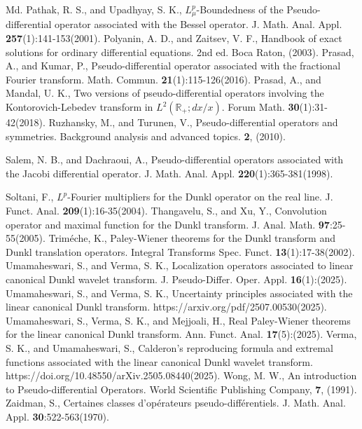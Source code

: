 \documentclass[12pt,a4paper,reqno]{amsproc}
\theoremstyle{definition}
\theoremstyle{remark}
\numberwithin{equation}{section}
\begin{document}
\begin{thebibliography}{Md.}
 Pathak, R. S., and Upadhyay, S. K.,  $L_\mu^p$-Boundedness of the Pseudo-differential operator associated with the Bessel operator. J. Math. Anal. Appl. \textbf{257}(1):141-153(2001).
Polyanin, A. D., and  Zaitsev, V. F., Handbook of exact solutions for ordinary differential equations. 2nd ed. Boca Raton, (2003).
Prasad, A., and  Kumar, P.,
Pseudo-differential operator associated with the fractional Fourier transform. Math. Commun. \textbf{21}(1):115-126(2016).
Prasad, A., and  Mandal, U. K., Two versions of pseudo-differential operators involving the Kontorovich-Lebedev transform in $L^2(\mathbb{R}_+;dx/x)$. Forum Math. \textbf{30}(1):31-42(2018).
Ruzhansky, M., and  Turunen, V., Pseudo-differential operators and symmetries. Background analysis and advanced topics. \textbf{2}, (2010).

Salem, N. B., and Dachraoui, A.,  Pseudo-differential operators associated with the Jacobi differential operator. J. Math. Anal. Appl. \textbf{220}(1):365-381(1998).

 Soltani, F., $L^p$-Fourier multipliers for the Dunkl operator on the real line. J. Funct. Anal. \textbf{209}(1):16-35(2004).
Thangavelu, S., and Xu, Y., Convolution operator and maximal function for the Dunkl transform. J. Anal. Math. \textbf{97}:25-55(2005).
 Trim\'eche, K.,  Paley-Wiener theorems for the Dunkl transform and Dunkl translation operators. Integral Transforms Spec. Funct. \textbf{13}(1):17-38(2002).
  Umamaheswari, S., and  Verma, S. K., Localization operators associated to linear canonical Dunkl wavelet transform. J. Pseudo-Differ. Oper. Appl. \textbf{16}(1):(2025).
 Umamaheswari, S., and  Verma, S. K., Uncertainty principles associated with the linear
canonical Dunkl transform. https://arxiv.org/pdf/2507.00530(2025).
 Umamaheswari, S.,  Verma, S. K., and Mejjoali, H., Real Paley-Wiener theorems for the linear canonical Dunkl transform.  Ann. Funct. Anal. \textbf{17}(5):(2025).
   Verma, S. K., and Umamaheswari, S., Calderon's reproducing formula and extremal functions associated with the linear canonical Dunkl wavelet transform. https://doi.org/10.48550/arXiv.2505.08440(2025).
Wong, M. W.,  An introduction to Pseudo-differential Operators.  World Scientific Publishing Company, \textbf{7}, (1991).
 Zaidman, S., Certaines classes d'opérateurs pseudo-différentiels.  J. Math. Anal. Appl. \textbf{30}:522-563(1970).

\end{thebibliography}
\end{document}
